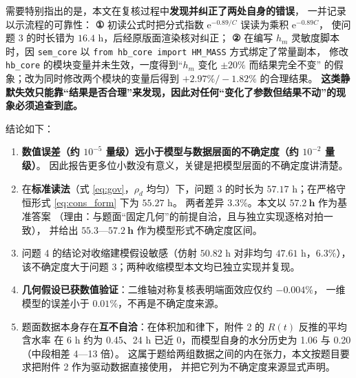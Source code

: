 \documentclass[12pt,a4paper]{ctexart}
\newcommand{\ee}{\mathrm{e}}
\begin{document}
\noindent 需要特别指出的是，本文在复核过程中\textbf{发现并纠正了两处自身的错误}，
一并记录以示流程的可靠性：
\textbf{①} 初读公式时把分式指数 $\ee^{-0.89/C}$ 误读为乘积 $\ee^{-0.89C}$，
使问题 3 的时长错为 $16.4$ h，后经原版面渲染核对纠正；
\textbf{②} 在编写 $h_m$ 灵敏度脚本时，因 \texttt{sem\_core} 以
\texttt{from hb\_core import HM\_MASS} 方式绑定了常量副本，
修改 \texttt{hb\_core} 的模块变量并未生效，一度得到“$h_m$ 变化 $\pm20\%$ 而结果完全不变”
的假象；改为同时修改两个模块的变量后得到 $+2.97\%/-1.82\%$ 的合理结果。
\textbf{这类静默失效只能靠“结果是否合理”来发现，因此对任何“变化了参数但结果不动”的现象必须追查到底。}



\begin{table}[htbp]
\centering
\caption*{表 D\quad 问题 3 烘干时长的不确定度分解}

\small
\end{table}

\noindent 结论如下：

\begin{enumerate}[label=\arabic*),leftmargin=1.8em,itemsep=1pt]
  \item \textbf{数值误差（约 $10^{-5}$ 量级）远小于模型与数据层面的不确定度（约 $10^{-2}$ 量级）}。
        因此报告更多位小数没有意义，关键是把模型层面的不确定度讲清楚。
  \item 在\textbf{标准读法}（式 \eqref{eq:gov}，$\rho_d$ 均匀）下，问题 3 的时长为
        $57.17$ h；在严格守恒形式 \eqref{eq:cons_form} 下为 $55.27$ h。
        两者差异 $3.3\%$。本文以 $\mathbf{57.2\ h}$ 作为基准答案
        （理由：与题面“固定几何”的前提自洽，且与独立实现逐格对拍一致），
        并给出 $\mathbf{55.3\text{—}57.2\ h}$ 作为模型形式不确定度区间。
  \item 问题 4 的结论对收缩建模假设敏感（仿射 $50.82$ h 对非均匀 $47.61$ h，$6.3\%$），
        该不确定度大于问题 3；两种收缩模型本文均已独立实现并复现。
  \item \textbf{几何假设已获数值验证}：二维轴对称复核表明端面效应仅约 $-0.004\%$，
        一维模型的误差小于 $0.01\%$，不再是不确定度来源。
  \item 题面数据本身存在\textbf{互不自洽}：在体积加和律下，附件 2 的 $R(t)$ 反推的平均含水率
        在 6 h 约为 0.45、24 h 已近 0，而模型自身的水分历史为 1.06 与 0.20（中段相差 4—13 倍）。
        这属于题给两组数据之间的内在张力，本文按题目要求把附件 2 作为驱动数据直接使用，
        并把它列为不确定度来源显式声明。
\end{enumerate}
\end{document}
